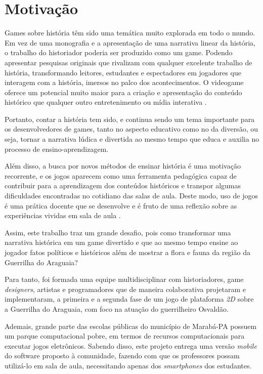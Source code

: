 \section{Motivação}
\label{sec:motivacao}

Games sobre história têm sido uma temática muito explorada em todo o mundo. Em vez de uma monografia e a apresentação de uma narrativa linear da história, o trabalho do historiador poderia ser produzido como um game. Podendo apresentar pesquisas originais que rivalizam com qualquer excelente trabalho de história, transformando leitores, estudantes e espectadores em jogadores que interagem com a história, imersos no palco dos acontecimentos. O videogame oferece um potencial muito maior para a criação e apresentação do conteúdo histórico que qualquer outro entretenimento ou mídia interativa \cite{bib:spring2015}.

Portanto, contar a história tem sido, e continua sendo um tema importante para os desenvolvedores de games, tanto no aspecto educativo como no da diversão, ou seja, tornar a narrativa lúdica e divertida ao mesmo tempo que educa e auxilia no processo de ensino-aprendizagem.

Além disso, a busca por novos métodos de ensinar história é uma motivação recorrente, e os jogos aparecem como uma ferramenta pedagógica capaz de contribuir para a aprendizagem dos conteúdos históricos e transpor algumas dificuldades encontradas no cotidiano das salas de aula. Deste modo, uso de jogos é uma prática docente que se desenvolve e é fruto de uma reflexão sobre as experiências vividas em sala de aula \cite{bib:teixeira2016}.

Assim, este trabalho traz um grande desafio, pois como transformar uma narrativa histórica em um game divertido e que ao mesmo tempo ensine ao jogador fatos políticos e históricos além de mostrar a flora e fauna da região da Guerrilha do Araguaia?

Para tanto, foi formada uma equipe multidisciplinar com historiadores, game \textit{designers}, artistas e programadores que de maneira colaborativa projetaram e implementaram, a primeira e a segunda fase de um jogo de plataforma \textit{2D} sobre a Guerrilha do Araguaia, com foco na atuação do guerrilheiro Osvaldão.

Ademais, grande parte das escolas públicas do município de Marabá-PA possuem um parque computacional pobre, em termos de recursos computacionais para executar jogos eletrônicos. Sabendo disso, este projeto entrega uma versão \textit{mobile} do software proposto à comunidade, fazendo com que os professores possam utilizá-lo em sala de aula, necessitando apenas dos \textit{smartphones} dos estudantes.

